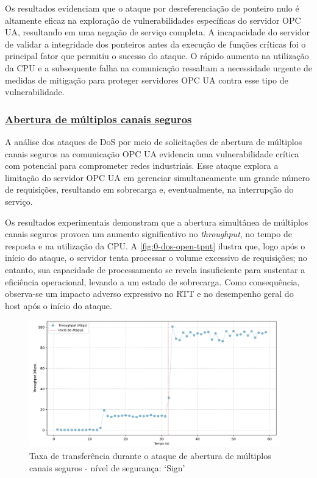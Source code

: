             Os resultados evidenciam que o ataque por desreferenciação de ponteiro nulo é altamente eficaz na exploração de vulnerabilidades específicas do servidor OPC UA, resultando em uma negação de serviço completa. A incapacidade do servidor de validar a integridade dos ponteiros antes da execução de funções críticas foi o principal fator que permitiu o sucesso do ataque. O rápido aumento na utilização da CPU e a subsequente falha na comunicação ressaltam a necessidade urgente de medidas de mitigação para proteger servidores OPC UA contra esse tipo de vulnerabilidade.


        \subsubsection*{\underline{Abertura de múltiplos canais seguros}}

            A análise dos ataques de DoS por meio de solicitações de abertura de múltiplos canais seguros na comunicação OPC UA evidencia uma vulnerabilidade crítica com potencial para comprometer redes industriais. Esse ataque explora a limitação do servidor OPC UA em gerenciar simultaneamente um grande número de requisições, resultando em sobrecarga e, eventualmente, na interrupção do serviço.

            Os resultados experimentais demonstram que a abertura simultânea de múltiplos canais seguros provoca um aumento significativo no \textit{throughput}, no tempo de resposta e na utilização da CPU. A \autoref{fig:0-dos-open-tput} ilustra que, logo após o início do ataque, o servidor tenta processar o volume excessivo de requisições; no entanto, sua capacidade de processamento se revela insuficiente para sustentar a eficiência operacional, levando a um estado de sobrecarga. Como consequência, observa-se um impacto adverso expressivo no RTT e no desempenho geral do host após o início do ataque.        

            \begin{figure}[htbp!]
                \caption{\label{fig:0-dos-open-tput}Taxa de transferência durante o ataque de abertura de múltiplos canais seguros - nível de segurança: `Sign'}
                \begin{center}
                    \includegraphics[width=0.972\textwidth]{USPSC-img/output/cropped/1-dos_open_multiple_secure_channels-tput.png}
                \end{center}
            \end{figure}

